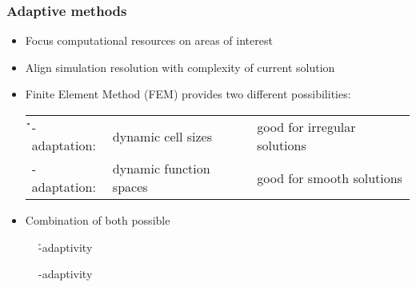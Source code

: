 \begin{frame}
\frametitle{Adaptive methods}

\begin{itemize}
\item Focus computational resources on areas of interest
\item Align simulation resolution with complexity of current solution
\end{itemize}

\vfill{}

\begin{itemize}
\item Finite Element Method (FEM) provides two different possibilities:
\begin{tabular}{lll}
  \textbf{\h}-adaptation: & dynamic cell sizes & good for irregular solutions \\
  \textbf{\p}-adaptation: & dynamic function spaces & good for smooth solutions
\end{tabular}
\item Combination of both possible
\end{itemize}

\vfill{}

\begin{minipage}{.49\textwidth}
  \begin{figure}
  \caption{\h-adaptivity}
  \end{figure}
\end{minipage}
\begin{minipage}{.49\textwidth}
  \begin{figure}
  \caption{\p-adaptivity}
  \end{figure}
\end{minipage}
\end{frame}





